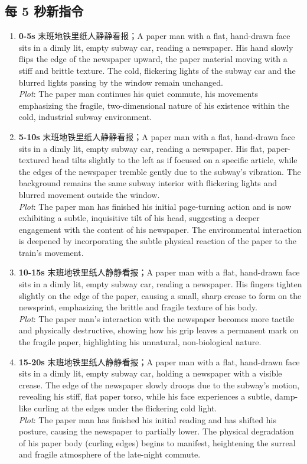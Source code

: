 \documentclass[11pt,a4paper]{article}
\begin{document}
\subsection*{每 5 秒新指令}
\begin{enumerate}
\item \textbf{0-5s} 末班地铁里纸人静静看报；A paper man with a flat, hand-drawn face sits in a dimly lit, empty subway car, reading a newspaper. His hand slowly flips the edge of the newspaper upward, the paper material moving with a stiff and brittle texture. The cold, flickering lights of the subway car and the blurred lights passing by the window remain unchanged.\\\newline \textit{Plot}: The paper man continues his quiet commute, his movements emphasizing the fragile, two-dimensional nature of his existence within the cold, industrial subway environment.
\item \textbf{5-10s} 末班地铁里纸人静静看报；A paper man with a flat, hand-drawn face sits in a dimly lit, empty subway car, reading a newspaper. His flat, paper-textured head tilts slightly to the left as if focused on a specific article, while the edges of the newspaper tremble gently due to the subway's vibration. The background remains the same subway interior with flickering lights and blurred movement outside the window.\\\newline \textit{Plot}: The paper man has finished his initial page-turning action and is now exhibiting a subtle, inquisitive tilt of his head, suggesting a deeper engagement with the content of his newspaper. The environmental interaction is deepened by incorporating the subtle physical reaction of the paper to the train's movement.
\item \textbf{10-15s} 末班地铁里纸人静静看报；A paper man with a flat, hand-drawn face sits in a dimly lit, empty subway car, reading a newspaper. His fingers tighten slightly on the edge of the paper, causing a small, sharp crease to form on the newsprint, emphasizing the brittle and fragile texture of his body.\\\newline \textit{Plot}: The paper man's interaction with the newspaper becomes more tactile and physically destructive, showing how his grip leaves a permanent mark on the fragile paper, highlighting his unnatural, non-biological nature.
\item \textbf{15-20s} 末班地铁里纸人静静看报；A paper man with a flat, hand-drawn face sits in a dimly lit, empty subway car, holding a newspaper with a visible crease. The edge of the newspaper slowly droops due to the subway's motion, revealing his stiff, flat paper torso, while his face experiences a subtle, damp-like curling at the edges under the flickering cold light.\\\newline \textit{Plot}: The paper man has finished his initial reading and has shifted his posture, causing the newspaper to partially lower. The physical degradation of his paper body (curling edges) begins to manifest, heightening the surreal and fragile atmosphere of the late-night commute.

\end{enumerate}
\end{document}
